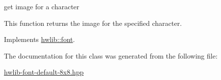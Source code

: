 get image for a character 

This function returns the image for the specified character. 

Implements \hyperlink{classhwlib_1_1font_ab292f5c14db5727c2ef67cfa8df4e88d}{hwlib\+::font}.



The documentation for this class was generated from the following file\+:\begin{DoxyCompactItemize}
\item 
\hyperlink{hwlib-font-default-8x8_8hpp}{hwlib-\/font-\/default-\/8x8.\+hpp}\end{DoxyCompactItemize}
